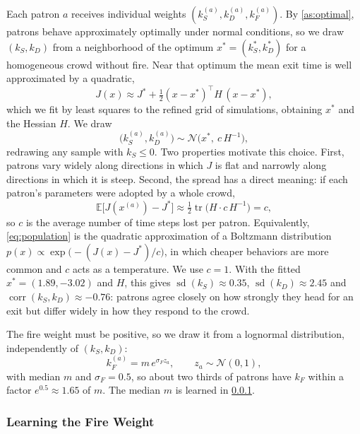 Each patron $a$ receives individual weights $(k^{(a)}_S, k^{(a)}_D, k^{(a)}_F)$. By
\cref{as:optimal}, patrons behave approximately optimally under normal conditions, so we
draw $(k_S, k_D)$ from a neighborhood of the optimum $x^* = (k_S^*, k_D^*)$ for a
homogeneous crowd without fire. Near that optimum the mean exit time is well approximated
by a quadratic,
\begin{equation}\label{eq:quadratic}
  J(x) \approx J^* + \tfrac{1}{2}(x - x^*)^\top H\, (x - x^*),
\end{equation}
which we fit by least squares to the refined grid of simulations, obtaining $x^*$ and the
Hessian $H$. We draw
\begin{equation}\label{eq:population}
  \bigl(k^{(a)}_S, k^{(a)}_D\bigr) \sim \mathcal{N}\bigl(x^*,\ c\,H^{-1}\bigr),
\end{equation}
redrawing any sample with $k_S \le 0$. Two properties motivate this choice. First, patrons
vary widely along directions in which $J$ is flat and narrowly along directions in which
it is steep. Second, the spread has a direct meaning: if each patron's parameters were
adopted by a whole crowd,
\begin{equation}\label{eq:expected_loss}
  \mathbb{E}\bigl[J(x^{(a)}) - J^*\bigr]
  \approx \tfrac{1}{2}\operatorname{tr}\bigl(H \cdot c\,H^{-1}\bigr) = c,
\end{equation}
so $c$ is the average number of time steps lost per patron. Equivalently,
\cref{eq:population} is the quadratic approximation of a Boltzmann distribution
$p(x) \propto \exp\bigl(-(J(x) - J^*)/c\bigr)$, in which cheaper behaviors are more common
and $c$ acts as a temperature. We use $c = 1$. With the fitted
$x^* = (1.89, -3.02)$ and $H$, this gives %
$\operatorname{sd}(k_S) \approx 0.35$, $\operatorname{sd}(k_D) \approx 2.45$ and
$\operatorname{corr}(k_S, k_D) \approx -0.76$: patrons agree closely on how strongly they
head for an exit but differ widely in how they respond to the crowd. %

The fire weight must be positive, so we draw it from a lognormal distribution,
independently of $(k_S, k_D)$:
\begin{equation}\label{eq:kF}
  k^{(a)}_F = m\, e^{\sigma_F z_a}, \qquad z_a \sim \mathcal{N}(0, 1),
\end{equation}
with median $m$ and $\sigma_F = 0.5$, so about two thirds of patrons have $k_F$ within a
factor $e^{0.5} \approx 1.65$ of $m$. The median $m$ is learned in \cref{sec:learn_kF}.

\subsubsection{Learning the Fire Weight}\label{sec:learn_kF}

